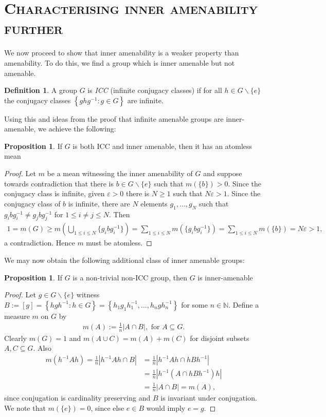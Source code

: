 \documentclass[10pt,oneside,openany,final]{memoir}
\newcommand{\ssection}[1]{%
\newpage%
\section[#1]{\centering\normalfont\scshape \textbf{#1}}}
\theoremstyle{definition}
\newtheorem{proposition}[theorem]{Proposition}
\newtheorem{definition}[theorem]{Definition}
\theoremstyle{Break}
\newcommand{\N}{\mathbb{N}}
\begin{document}
\ssection{Characterising inner amenability further}
We now proceed to show that inner amenability is a weaker property than amenability. To do this, we find a group which is inner amenable but not amenable.
\begin{definition}
	A group $G$ is \emph{ICC} (infinite conjugacy classes) if for all $h\in G\backslash\{e\}$ the conjugacy classes $\left\{ ghg^{-1}: g \in G \right\}$ are infinite.
\end{definition}
Using this and ideas from the proof that infinite amenable groups are inner-amenable, we achieve the following:
\begin{proposition}
	If $G$ is both ICC and inner amenable, then it has an atomless mean
\end{proposition}
\begin{proof}
	Let $m$ be a mean witnessing the inner amenability of $G$ and suppose towards contradiction that there is $b \in G\backslash\{e\}$ such that $m(\{b\})>0$. Since the conjugacy class is infinite, given $\varepsilon>0$ there is $N \geq 1$ such that $N \varepsilon > 1$. Since the conjugacy class of $b$ is infinite, there are $N$ elements $g_1,\dots,g_N$ such that $g_i b g_i^{-1} \neq g_j b g_j^{-1}$ for $1\leq i \neq j\leq N$. Then
	\begin{align*}
		1=m(G)\geq m(\bigcup_{1 \leq i \leq N} \{g_i b g_{i}^{-1}\})=\sum_{1 \leq i \leq N}m(\{g_ibg_i^{-1}\})=\sum_{1 \leq i \leq N}m(\{b\})=N\varepsilon > 1,
	\end{align*}
	a contradiction. Hence $m$ must be atomless.
\end{proof}

We may now obtain the following additional class of inner amenable groups:
\begin{proposition}
 If $G$ is a non-trivial non-ICC group, then $G$ is inner-amenable	
\end{proposition}
\begin{proof}
	Let $g \in G\backslash\{e\}$ witness $B:=[g]=\left\{ hgh^{-1} : h \in G \right\}=\left\{ h_1g_1h_1^{-1},\dots,h_ngh_n^{-1} \right\}$ for some $n \in \N$. Define a measure $m$ on $G$ by
	\begin{align*}
		m(A):=\frac{1}{n}|A \cap B|, \text{ for } A \subseteq G.
	\end{align*}
	Clearly $m(G)=1$ and $m(A \cup C)=m(A)+m(C)$ for disjoint subsets $A,C \subseteq G$. Also
	\begin{align*}
	m(h^{-1}A h)=\frac{1}{n}|h^{-1}Ah \cap B| &= \frac{1}{n}|h^{-1}Ah \cap h B h^{-1}| \\&= \frac{1}{n}|h^{-1}(A \cap hBh^{-1})h|\\&=\frac{1}{n}|A \cap B| = m(A),
	\end{align*}
	since conjugation is cardinality preserving and $B$ is invariant under conjugation. We note that $m(\{e\})=0$, since else $e \in B$ would imply $e=g$.
\end{proof}
\end{document}
